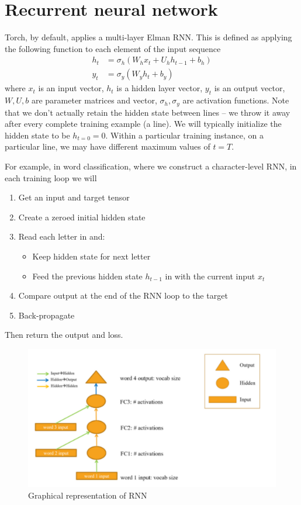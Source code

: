 \documentclass[11pt]{article}
\numberwithin{equation}{section}
\begin{document}
\section{Recurrent neural network}
Torch, by default, applies a multi-layer Elman RNN. This is defined as applying the following function to each element of the input sequence
\begin{align}
h_t  &= \sigma_h(W_h x_t + U_h h_{t-1} + b_h)\\
y_t  &= \sigma_y(W_y h_t + b_y)
\end{align}
where $x_t$ is an input vector, $h_t$ is a hidden layer vector, $y_t$ is an output vector, $W, U, b$ are parameter matrices and vector, $\sigma_h, \sigma_y$ are activation functions. Note that we don't actually retain the hidden state between lines -- we throw it away after every complete training example (a line). We will typically initialize the hidden state to be $h_{t=0}=0$. Within a particular training instance, on a particular line, we may have different maximum values of $t=T$. 

For example, in word classification, where we construct a character-level RNN, in each training loop we will
\begin{enumerate}[noitemsep]
\item Get an input and target tensor
\item Create a zeroed initial hidden state
\item Read each letter in and:
\begin{itemize}[noitemsep]
\item Keep hidden state for next letter
\item Feed the previous hidden state $h_{t-1}$ in with the current input $x_t$
\end{itemize}
\item Compare output at the end of the RNN loop to the target
\item Back-propagate
\end{enumerate}
Then return the output and loss.

\begin{figure}
\begin{center}
\includegraphics[width=0.8\columnwidth]{../figures/rnn.png}  
\end{center}
\caption{Graphical representation of RNN
}
\label{fig:rnn}
\end{figure}
\end{document}
